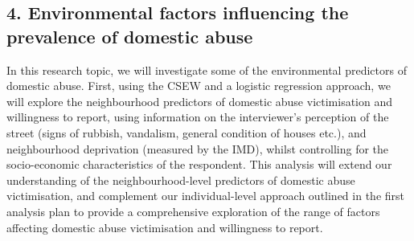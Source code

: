 \documentclass[11pt, a4paper]{article}
\begin{document}
\subsection*{4. Environmental factors influencing the prevalence of domestic abuse}

In this research topic, we will investigate some of the environmental predictors of domestic abuse. First, using the CSEW and a logistic regression approach, we will explore the neighbourhood predictors of domestic abuse victimisation and willingness to report, using information on the interviewer's perception of the street (signs of rubbish, vandalism, general condition of houses etc.), and neighbourhood deprivation (measured by the IMD), whilst controlling for the socio-economic characteristics of the respondent. This analysis will extend our understanding of the neighbourhood-level predictors of domestic abuse victimisation, and complement our individual-level approach outlined in the first analysis plan to provide a comprehensive exploration of the range of factors affecting domestic abuse victimisation and willingness to report.







%
%
%
%
%
\end{document}

